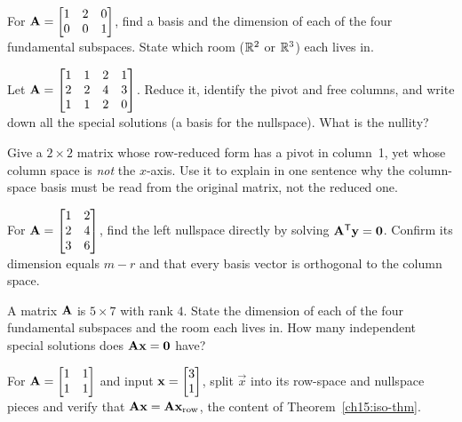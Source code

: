 \begin{exercise}\label{ch15:ex-basic}
For $\mathbf{A}=\begin{bmatrix}1&2&0\\0&0&1\end{bmatrix}$, find a basis and the dimension of each of
the four fundamental subspaces. State which room ($\mathbb{R}^2$ or $\mathbb{R}^3$) each lives in.
\end{exercise}

\begin{exercise}\label{ch15:ex-special}
Let $\mathbf{A}=\begin{bmatrix}1&1&2&1\\2&2&4&3\\1&1&2&0\end{bmatrix}$. Reduce it, identify the
pivot and free columns, and write down all the special solutions (a basis for the nullspace).
What is the nullity?
\end{exercise}

\begin{exercise}\label{ch15:ex-colspace-trap}
Give a $2\times2$ matrix whose row-reduced form has a pivot in column~1, yet whose column space is
\emph{not} the $x$-axis. Use it to explain in one sentence why the column-space basis must be read
from the original matrix, not the reduced one.
\end{exercise}

\begin{exercise}\label{ch15:ex-leftnull}
For $\mathbf{A}=\begin{bmatrix}1&2\\2&4\\3&6\end{bmatrix}$, find the left nullspace directly by
solving $\mathbf{A}^{\mathsf{T}}\mathbf{y}=\mathbf{0}$. Confirm its dimension equals $m-r$ and that every basis vector
is orthogonal to the column space.
\end{exercise}

\begin{exercise}\label{ch15:ex-dimcheck}
A matrix $\mathbf{A}$ is $5\times 7$ with rank $4$. State the dimension of each of the four
fundamental subspaces and the room each lives in. How many independent special solutions does
$\mathbf{A}\mathbf{x}=\mathbf{0}$ have?
\end{exercise}

\begin{exercise}\label{ch15:ex-splitting}
For $\mathbf{A}=\begin{bmatrix}1&1\\1&1\end{bmatrix}$ and input $\mathbf{x}=\begin{bmatrix}3\\1\end{bmatrix}$, split
$\vec{x}$ into its row-space and nullspace pieces and verify that $\mathbf{A}\mathbf{x}=\mathbf{A}\mathbf{x}_
{\text{row}}$, the content of Theorem~\ref{ch15:iso-thm}.
\end{exercise}

